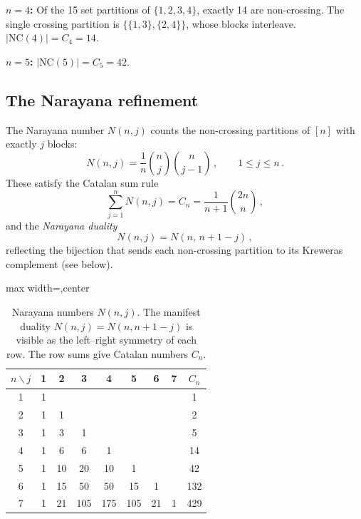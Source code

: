 \documentclass[11pt,letterpaper]{article}
\theoremstyle{plain}
\theoremstyle{definition}
\theoremstyle{remark}
\begin{document}
\medskip
\noindent
\textbf{$n=4$:}  Of the 15 set partitions of $\{1,2,3,4\}$, exactly 14 are
non-crossing.  The single crossing partition is $\bigl\{\{1,3\},\{2,4\}\bigr\}$,
whose blocks interleave.  $|\mathrm{NC}(4)| = C_4 = 14$.

\medskip
\noindent
\textbf{$n=5$:}  $|\mathrm{NC}(5)| = C_5 = 42$.

\subsection{The Narayana refinement}

The Narayana number $N(n,j)$ counts the non-crossing partitions of $[n]$ with
exactly $j$ blocks:
\begin{equation}
  N(n,j) = \frac{1}{n}\binom{n}{j}\binom{n}{j-1}\,,
  \qquad 1 \le j \le n\,.
  \label{eq16:narayana_def}
\end{equation}
These satisfy the Catalan sum rule
\begin{equation}
  \sum_{j=1}^{n} N(n,j) = C_n = \frac{1}{n+1}\binom{2n}{n}\,,
  \label{eq16:catalan_sum}
\end{equation}
and the \emph{Narayana duality}
\begin{equation}
  N(n,j) = N(n,\, n+1-j)\,,
  \label{eq16:narayana_duality}
\end{equation}
reflecting the bijection that sends each non-crossing partition to its
Kreweras complement (see below).

\begin{table}[ht]
\centering
\renewcommand{\arraystretch}{1.3}
\begin{adjustbox}{max width=\textwidth,center}
\begin{tabular}{@{}c|ccccccc|c@{}}
\hline
$n \backslash j$ & 1 & 2 & 3 & 4 & 5 & 6 & 7 & $C_n$ \\
\hline
1 & 1 &   &   &   &   &   &   & 1 \\
2 & 1 & 1 &   &   &   &   &   & 2 \\
3 & 1 & 3 & 1 &   &   &   &   & 5 \\
4 & 1 & 6 & 6 & 1 &   &   &   & 14 \\
5 & 1 & 10 & 20 & 10 & 1 &   &   & 42 \\
6 & 1 & 15 & 50 & 50 & 15 & 1 &   & 132 \\
7 & 1 & 21 & 105 & 175 & 105 & 21 & 1 & 429 \\
\hline
\end{tabular}
\end{adjustbox}
\caption{Narayana numbers $N(n,j)$.  The manifest duality
$N(n,j) = N(n,n+1-j)$ is visible as the left--right symmetry of each row.
The row sums give Catalan numbers $C_n$.}
\label{tab16:narayana_table}
\end{table}
\end{document}
